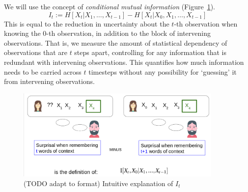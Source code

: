 \documentclass[11pt,letterpaper]{article}
\begin{document}
We will use the concept of \emph{conditional mutual information} (Figure~\ref{fig:it-surprisal-intuition}).
\begin{equation}
	I_t := H[X_t| X_1, \dots, X_{t-1}] - H[X_t| X_0, X_1, \dots, X_{t-1}]
\end{equation}
This is equal to the reduction in uncertainty about the $t$-th observation when knowing the $0$-th observation, in addition to the block of intervening observations.
That is, we measure the amount of statistical dependency of observations that are $t$ steps apart, controlling for any information that is redundant with intervening observations.
This quantifies how much information needs to be carried across $t$ timesteps without any possibility for `guessing' it from intervening observations.



\begin{figure}
\includegraphics[width=0.9\textwidth]{figures/listener-it.png}
	\caption{(TODO adapt to format) Intuitive explanation of $I_t$}\label{fig:it-surprisal-intuition}
\end{figure}
\end{document}
